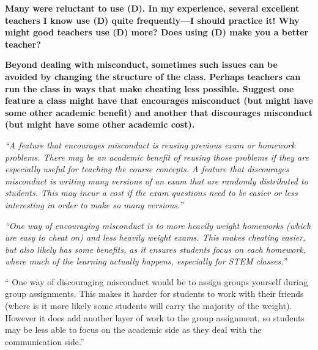 \documentclass[portrait,11pt]{seminar}
\begin{document}



\bs
{\it
}

\medskip

{\bf Many were reluctant to use (D). In my experience, several excellent teachers I know use (D) quite frequently---I should practice it! Why might good teachers use (D) more? Does using (D) make you a better teacher?}


\es

\bs

{\bf Beyond dealing with misconduct, sometimes such issues can be avoided by changing the structure of the class. Perhaps teachers can run the class in ways that make cheating less possible.  Suggest one feature a class might have that encourages misconduct (but might have some other academic benefit) and another that discourages misconduct (but might have some other academic cost).}

\it


{\it ``A feature that encourages misconduct is reusing previous exam or homework problems. There may be an academic benefit of reusing those problems if they are especially useful for teaching the course concepts. A feature that discourages misconduct is writing many versions of an exam that are randomly distributed to students. This may incur a cost if the exam questions need to be easier or less interesting in order to make so many versions.''}

\es

\bs 
{\it ``One way of encouraging misconduct is to more heavily weight homeworks (which are easy to cheat on) and less heavily weight exams. This makes cheating easier, but also likely has some benefits, as it ensures students focus on each homework, where much of the learning actually happens, especially for STEM classes.''

`` One way of discouraging misconduct would be to assign groups yourself during group assignments. This makes it harder for students to work with their friends (where is it more likely some students will carry the majority of the weight). However it does add another layer of work to the group assignment, so students may be less able to focus on the academic side as they deal with the communication side.''}

\es
\end{document}
